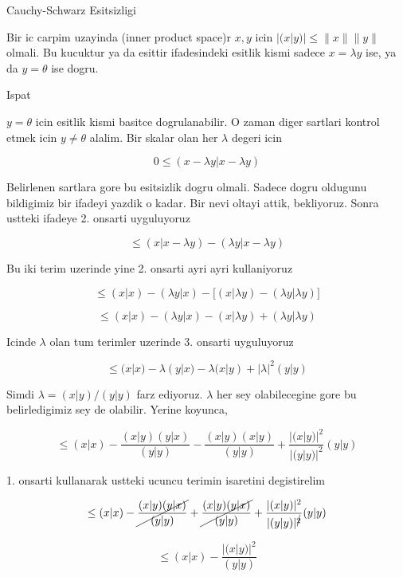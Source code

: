\documentclass[12pt,fleqn]{article}\usepackage{../common}
\begin{document}
Cauchy-Schwarz Esitsizligi

Bir ic carpim uzayinda (inner product space)r $x,y$ icin $|(x|y)| \le
\|x\|\|y\|$ olmali. 
Bu kucuktur ya da esittir ifadesindeki esitlik kismi sadece $x = \lambda y$
ise, ya da $y = \theta$ ise dogru. 

Ispat

$y = \theta$ icin esitlik kismi basitce dogrulanabilir. O zaman diger
sartlari kontrol etmek icin $y \ne \theta$ alalim. Bir skalar olan her
$\lambda$ degeri icin 

\[ 
0 \le (x-\lambda y | x-\lambda y) 
 \]

Belirlenen sartlara gore bu esitsizlik dogru olmali. Sadece dogru oldugunu
bildigimiz bir ifadeyi yazdik o kadar. Bir nevi oltayi attik, bekliyoruz. 
Sonra ustteki ifadeye 2. onsarti uyguluyoruz

\[ \le (x|x-\lambda y) - (\lambda y| x - \lambda y)\]

Bu iki terim uzerinde yine 2. onsarti ayri ayri kullaniyoruz

\[ 
\le (x|x) - (\lambda y|x) - 
\bigg[ (x|\lambda y) - (\lambda y|\lambda y) \bigg] 
\]

\[ 
\le (x|x) - (\lambda y|x) -  (x|\lambda y) + (\lambda y|\lambda y) 
\]

Icinde $\lambda$ olan tum terimler uzerinde 3. onsarti uyguluyoruz

\[ 
\le
(x|x) - \lambda(y|x) -
\lambda(x|y) + |\lambda|^2 (y|y)
 \]

Simdi $\lambda  = (x|y)/(y|y)$ farz ediyoruz. $\lambda$ her sey olabilecegine gore bu 
belirledigimiz sey de olabilir. Yerine koyunca, 

\[ \le (x|x) - 
\frac{ (x|y)(y|x)}{(y|y)} - 
\frac{ (x|y)(x|y)}{(y|y)} + 
\frac{ |(x|y)|^2}{|(y|y)|^2}(y|y)
 \]

1. onsarti kullanarak ustteki ucuncu terimin isaretini degistirelim

\[ \le (x|x) - 
\cancel{\frac{ (x|y)(y|x)}{(y|y)}} +
\cancel{\frac{ (x|y)(y|x)}{(y|y)}} + 
\frac{ |(x|y)|^2}{|(y|y)|^{\cancel{2}}}(y|y)
 \]

\[ \le (x|x) - 
\frac{ |(x|y)|^2}{(y|y)}
 \]
\end{document}
